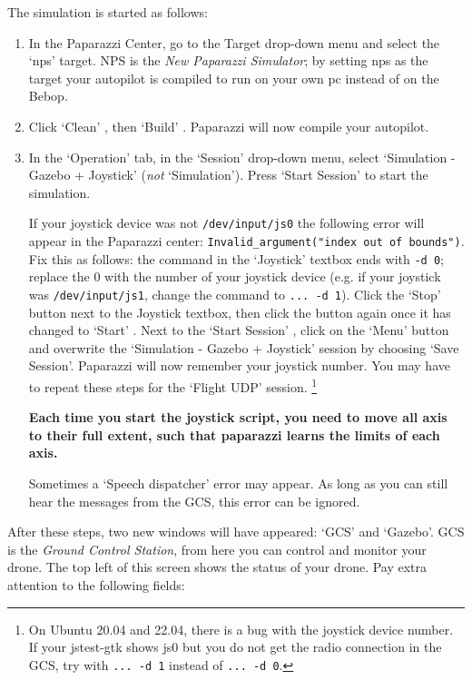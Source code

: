 The simulation is started as follows:
\begin{enumerate}
	\item In the Paparazzi Center, go to the Target drop-down menu and select the `nps' target. NPS is the \textsl{New Paparazzi Simulator}; by setting nps as the target your autopilot is compiled to run on your own pc instead of on the Bebop.
	
	\item Click `Clean' , then `Build' . Paparazzi will now compile your autopilot.
	
	\item In the `Operation' tab, in the `Session' drop-down menu, select `Simulation - Gazebo + Joystick' (\emph{not} `Simulation'). Press `Start Session'  to start the simulation.
	
	If your joystick device was not \verb"/dev/input/js0" the following error will appear in the Paparazzi center: \verb|Invalid_argument("index out of bounds")|. Fix this as follows: the command in the `Joystick' textbox ends with \verb"-d 0"; replace the 0 with the number of your joystick device (e.g. if your joystick was \verb"/dev/input/js1", change the command to \verb"... -d 1"). Click the `Stop'  button next to the Joystick textbox, then click the button again once it has changed to `Start' . Next to the `Start Session' , click on the `Menu'  button and overwrite the `Simulation - Gazebo + Joystick' session by choosing `Save Session'. Paparazzi will now remember your joystick number. You may have to repeat these steps for the `Flight UDP' session.
	\footnote{On Ubuntu 20.04 and 22.04, there is a bug with the joystick device number. If your jstest-gtk shows js0 but you do not get the radio connection in the GCS, try with \texttt{... -d 1} instead of \texttt{... -d 0}.}

	\textbf{Each time you start the joystick script, you need to move all axis to their full extent, such that paparazzi learns the limits of each axis.}
	
	Sometimes a `Speech dispatcher' error may appear. As long as you can still hear the messages from the GCS, this error can be ignored.
\end{enumerate}

After these steps, two new windows will have appeared: `GCS' and `Gazebo'.
GCS is the \emph{Ground Control Station}, from here you can control and monitor your drone.
The top left of this screen shows the status of your drone. Pay extra attention to the following fields:

